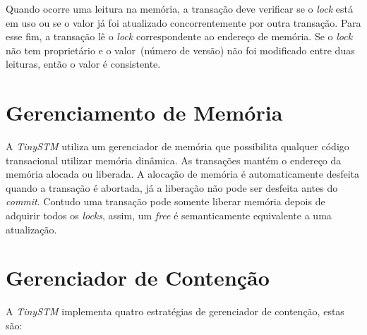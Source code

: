 \documentclass[diss,capa]{texufpel}
\begin{document}
Quando ocorre uma leitura na memória, a transação deve verificar se o \emph{lock} está em uso ou se  o valor já foi atualizado concorrentemente por outra transação. Para esse fim, a transação lê o \emph{lock} correspondente ao endereço de memória. Se o \emph{lock} não tem proprietário e o valor~(número de versão) não foi modificado entre duas leituras, então o valor é consistente.

\section{Gerenciamento de Memória}

A \emph{TinySTM} utiliza um gerenciador de memória que possibilita qualquer código transacional utilizar memória dinâmica. As transações mantém o endereço da memória alocada ou liberada. A alocação de memória é automaticamente desfeita quando a transação é abortada, já a liberação não pode ser desfeita antes do \emph{commit}. Contudo uma transação pode somente liberar memória depois de adquirir todos os \emph{locks}, assim, um \emph{free} é semanticamente equivalente a uma atualização.

\section{Gerenciador de Contenção}

A \emph{TinySTM} implementa quatro estratégias de gerenciador de contenção, estas são:
\end{document}
